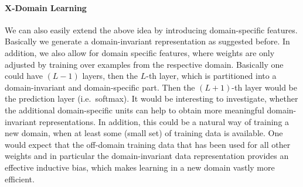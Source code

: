 \documentclass{article}
\begin{document}
\paragraph{X-Domain Learning} We can also easily extend the above idea by introducing domain-specific features. Basically we generate a domain-invariant representation as suggested before. In addition, we also allow for domain specific features, where weights are only adjusted by training over examples from the respective domain. Basically one could have $(L-1)$ layers, then the $L$-th layer, which is partitioned into a domain-invariant and domain-specific part. Then the $(L+1)$-th layer would be the prediction layer (i.e.~softmax). It would be interesting to investigate, whether the additional domain-specific units can help to obtain more meaningful domain-invariant representations. In addition, this could be a natural way of training a new domain, when at least some (small set) of training data is available. One would expect that the off-domain training data that has been used for all other weights and in particular the domain-invariant data representation provides an effective inductive bias, which makes learning in a new domain vastly more efficient. 




\end{document}
